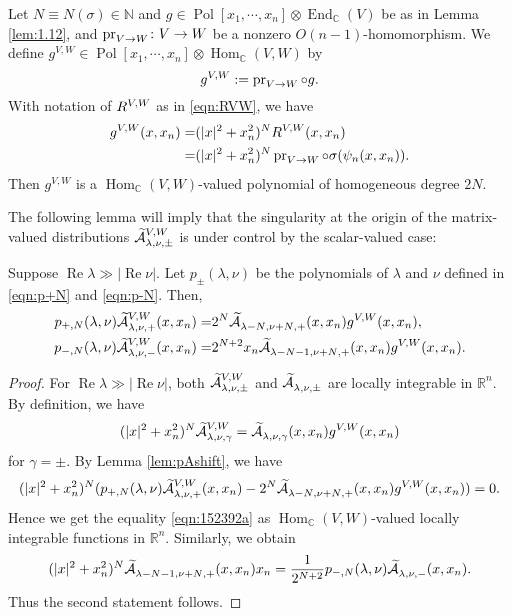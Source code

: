 Let $N \equiv N(\sigma) \in {\mathbb{N}}$ 
 and $g \in {\operatorname{Pol}}[x_1, \cdots, x_n] \otimes {\operatorname{End}}_{\mathbb{C}}(V)$
 be as in Lemma \ref{lem:1.12}, 
 and $\operatorname{pr}_{{V}\to{W}} \colon V \to W$ be a nonzero $O(n-1)$-homomorphism.  
We define 
$
   g^{V,W} 
   \in{\operatorname{Pol}}[x_1, \cdots, x_n] 
   \otimes 
   {\operatorname{Hom}}_{\mathbb{C}}(V,W)
$
 by
\begin{equation}
   g^{V,W}
  :=
  \operatorname{pr}_{{V}\to{W}} \circ g.  
\end{equation}
With notation of 
$
 R^{{V},{W}}
$ as in \eqref{eqn:RVW}, 
 we have 
\begin{align}
\label{eqn:gVW}
g^{V,W}(x,x_n)=&(|x|^2+x_n^2)^N R^{{V},{W}} (x,x_n)
\\
\notag
              =&(|x|^2+x_n^2)^N \operatorname{pr}_{{V}\to{W}} \circ \sigma(\psi_n(x,x_n)).  
\end{align}
Then $g^{V,W}$ is a $\operatorname{Hom}_{\mathbb{C}}(V,W)$-valued
 polynomial of homogeneous degree $2N$.  



The following lemma will imply 
 that the singularity at the origin
 of the matrix-valued distributions
 $\widetilde{{\mathcal{A}}}_{{\lambda},{\nu},{\pm}}^{{V,W}}$
 is under control by the scalar-valued case:
\begin{lemma}
\label{lem:152392}
Suppose $\operatorname{Re} \lambda \gg |\operatorname{Re} \nu|$.  
Let $p_{\pm}(\lambda,\nu)$ be the polynomials of $\lambda$ and $\nu$
 defined in \eqref{eqn:p+N} and \eqref{eqn:p-N}.  
Then, 
\begin{align}
\label{eqn:152392a}
p_{+,N}(\lambda,\nu) \widetilde{{\mathcal{A}}}_{{\lambda},{\nu},{+}}^{{V,W}}(x,x_n)
=&
2^N \widetilde{{\mathcal{A}}}_{{\lambda-N},{\nu+N},{+}}^{{}}(x,x_n)g^{V,W}(x,x_n), 
\\
\label{eqn:152392b}
p_{-,N}(\lambda,\nu) \widetilde{{\mathcal{A}}}_{{\lambda},{\nu},{-}}^{{V,W}}(x,x_n)
=&
2^{N+2} x_n \widetilde{{\mathcal{A}}}_{{\lambda-N-1},{\nu+N},{+}}^{{}}(x,x_n) g^{V,W}(x,x_n). 
\end{align}  
\end{lemma}
\begin{proof}
For $\operatorname{Re} \lambda \gg |\operatorname{Re} \nu|$, 
 both $\widetilde{{\mathcal{A}}}_{{\lambda},{\nu},{\pm}}^{{V,W}}$
 and $\widetilde{{\mathcal{A}}}_{{\lambda},{\nu},{\pm}}^{{}}$
 are locally integrable in ${\mathbb{R}}^n$.  
By definition, 
 we have
\begin{equation*}
(|x|^2+ x_n^2)^N \widetilde{{\mathcal{A}}}_{{\lambda},{\nu},{\gamma}}^{{V,W}}
 =
\widetilde{{\mathcal{A}}}_{{\lambda},{\nu},{\gamma}}^{{}} (x,x_n) g^{V,W} (x,x_n)
\end{equation*}
for $\gamma=\pm$.  
By Lemma \ref{lem:pAshift}, 
 we have
\[
  (|x|^2+x_n^2)^N
  (p_{+,N}(\lambda,\nu) \widetilde{{\mathcal{A}}}_{{\lambda},{\nu},{+}}^{{V,W}}(x,x_n)
  -2^N \widetilde{{\mathcal{A}}}_{{\lambda-N},{\nu+N},{+}}^{{}}(x,x_n) g^{V,W}(x,x_n))
  =0.  
\]
Hence we get the equality \eqref{eqn:152392a}
 as ${\operatorname{Hom}}_{\mathbb{C}}(V,W)$-valued 
 locally integrable functions in ${\mathbb{R}}^n$.  
Similarly,
we obtain
\[
  (|x|^2+ x_n^2)^N \widetilde{{\mathcal{A}}}_{{\lambda-N-1},{\nu+N},{+}}^{{}} (x,x_n) x_n
=
\frac{1}{2^{N+2}}
p_{-,N}(\lambda, \nu)
\widetilde{{\mathcal{A}}}_{{\lambda},{\nu},{-}}^{{}} (x,x_n).  
\]
Thus the second statement follows.  
\end{proof}

